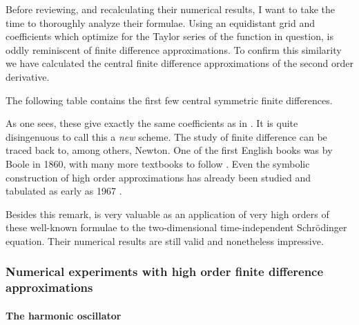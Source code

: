 Before reviewing, and recalculating their numerical results, I want to take the time to thoroughly analyze their formulae. Using an equidistant grid and coefficients which optimize for the Taylor series of the function in question, is oddly reminiscent of finite difference approximations. To confirm this similarity we have calculated the central finite difference approximations of the second order derivative.

The following table contains the first few central symmetric finite differences.
\begin{center}
    
\end{center}

As one sees, these give exactly the same coefficients as in \cite{wang_new_2009}. It is quite disingenuous to call this a \emph{new} scheme. The study of finite difference can be traced back to, among others, Newton. One of the first English books was by Boole \cite{boole_calculus_1860} in 1860, with many more textbooks to follow \cite{thomson_calculus_1933,jordan_calculus_1965}. Even the symbolic construction of high order approximations has already been studied and tabulated as early as 1967 \cite{ballester_construction_1967,keller_symbolic_1978,fornberg_generation_1988}.

Besides this remark, \cite{wang_new_2009} is very valuable as an application of very high orders of these well-known formulae to the two-dimensional time-independent Schrödinger equation. Their numerical results are still valid and nonetheless impressive.

\subsubsection{Numerical experiments with high order finite difference approximations}\label{sec:c4_fd_numerical}

\paragraph{The harmonic oscillator}

